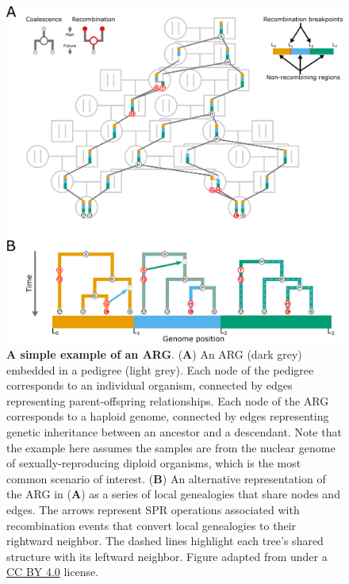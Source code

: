 \begin{figure}%
    \centering
    \includegraphics[width=\textwidth]{adapted_figs/arg_illustration.png}
    \caption[A simple example of an \acf{ARG}]{\textbf{A simple example of an \acf{ARG}}. (\textbf{A}) An \ac{ARG} (dark grey) embedded in a pedigree (light grey). Each node of the pedigree corresponds to an individual organism, connected by edges representing parent-offspring relationships. Each node of the \ac{ARG} corresponds to a haploid genome, connected by edges representing genetic inheritance between an ancestor and a descendant. Note that the example here assumes the samples are from the nuclear genome of sexually-reproducing diploid organisms, which is the most common scenario of interest. (\textbf{B}) An alternative representation of the \ac{ARG} in (\textbf{A}) as a series of local genealogies that share nodes and edges. The arrows represent \acf{SPR} operations associated with recombination events that convert local genealogies to their rightward neighbor. The dashed lines highlight each tree's shared structure with its leftward neighbor. Figure adapted from \cite{lewanski2023era} under a \href{https://creativecommons.org/licenses/by/4.0/}{CC BY 4.0} license.}
    \label{fig:intro-F1}
\end{figure}

